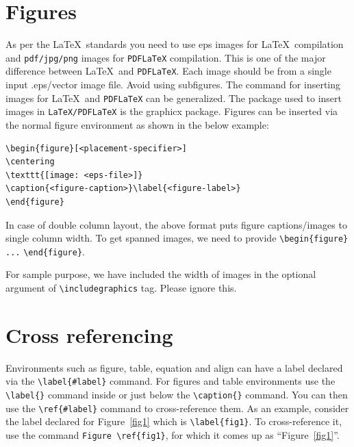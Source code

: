 \documentclass[lineno,pdflatex,sn-nature]{sn-jnl}%
\begin{document}
\section{Figures}\label{sec6}

As per the \LaTeX\ standards you need to use eps images for \LaTeX\ compilation and \verb+pdf/jpg/png+ images for \verb+PDFLaTeX+ compilation. This is one of the major difference between \LaTeX\ and \verb+PDFLaTeX+. Each image should be from a single input .eps/vector image file. Avoid using subfigures. The command for inserting images for \LaTeX\ and \verb+PDFLaTeX+ can be generalized. The package used to insert images in \verb+LaTeX/PDFLaTeX+ is the graphicx package. Figures can be inserted via the normal figure environment as shown in the below example:

\bigskip
\begin{verbatim}
\begin{figure}[<placement-specifier>]
\centering
\texttt{[image: <eps-file>]}
\caption{<figure-caption>}\label{<figure-label>}
\end{figure}
\end{verbatim}
\bigskip


In case of double column layout, the above format puts figure captions/images to single column width. To get spanned images, we need to provide \verb+\begin{figure}+ \verb+...+ \verb+\end{figure}+.

For sample purpose, we have included the width of images in the optional argument of \verb+\includegraphics+ tag. Please ignore this. 


\section{Cross referencing}\label{sec8}

Environments such as figure, table, equation and align can have a label
declared via the \verb+\label{#label}+ command. For figures and table
environments use the \verb+\label{}+ command inside or just
below the \verb+\caption{}+ command. You can then use the
\verb+\ref{#label}+ command to cross-reference them. As an example, consider
the label declared for Figure~\ref{fig1} which is
\verb+\label{fig1}+. To cross-reference it, use the command 
\verb+Figure \ref{fig1}+, for which it comes up as
``Figure~\ref{fig1}''. 
\end{document}
